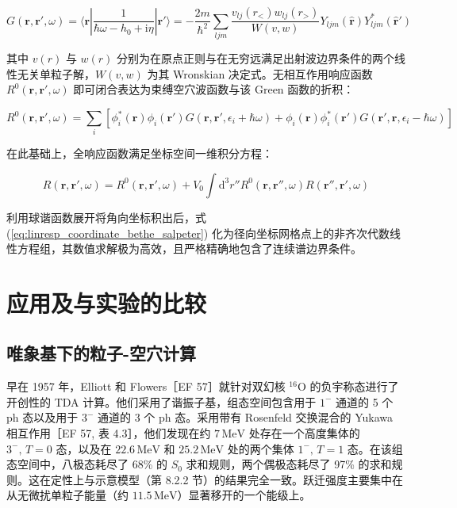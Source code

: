 \begin{equation}
G(\boldsymbol{r},\boldsymbol{r}',\omega)=\langle\boldsymbol{r}|\frac{1}{\hbar\omega-h_{0}+\mathrm{i}\eta}|\boldsymbol{r}'\rangle=-\frac{2m}{\hbar^{2}}\sum_{ljm}\frac{v_{lj}(r_{<})w_{lj}(r_{>})}{W(v,w)}Y_{ljm}(\hat{\boldsymbol{r}})Y^{*}_{ljm}(\hat{\boldsymbol{r}}')\label{eq:linresp_single_particle_green}
\end{equation}

其中 $v(r)$ 与 $w(r)$ 分别为在原点正则与在无穷远满足出射波边界条件的两个线性无关单粒子解，$W(v,w)$ 为其
Wronskian 决定式。无相互作用响应函数 $R^{0}(\boldsymbol{r},\boldsymbol{r}',\omega)$
即可闭合表达为束缚空穴波函数与该 Green 函数的折积：

\begin{equation}
R^{0}(\boldsymbol{r},\boldsymbol{r}',\omega)=\sum_{i}\left[\phi^{*}_{i}(\boldsymbol{r})\phi_{i}(\boldsymbol{r}')G(\boldsymbol{r},\boldsymbol{r}',\epsilon_{i}+\hbar\omega)+\phi_{i}(\boldsymbol{r})\phi^{*}_{i}(\boldsymbol{r}')G(\boldsymbol{r}',\boldsymbol{r},\epsilon_{i}-\hbar\omega)\right]\label{eq:linresp_r0_coordinate_space}
\end{equation}

在此基础上，全响应函数满足坐标空间一维积分方程：

\begin{equation}
R(\boldsymbol{r},\boldsymbol{r}',\omega)=R^{0}(\boldsymbol{r},\boldsymbol{r}',\omega)+V_{0}\int\mathrm{d}^{3}r''R^{0}(\boldsymbol{r},\boldsymbol{r}'',\omega)R(\boldsymbol{r}'',\boldsymbol{r}',\omega)\label{eq:linresp_coordinate_bethe_salpeter}
\end{equation}

利用球谐函数展开将角向坐标积出后，式 (\ref{eq:linresp_coordinate_bethe_salpeter}) 化为径向坐标网格点上的非齐次代数线性方程组，其数值求解极为高效，且严格精确地包含了连续谱边界条件。

\section{应用及与实验的比较\label{sec:8.6_=005E94=007528=0053CA=004E0E=005B9E=009A8C=007684=006BD4=008F83}}

\subsection{唯象基下的粒子-空穴计算\label{subsec:8.6.1_=00552F=008C61=0057FA=004E0B=007684=007C92=005B50-=007A7A=007A74=008BA1=007B97}}

早在 1957 年，Elliott 和 Flowers［EF 57］就针对双幻核 $^{16}\mathrm{O}$ 的负宇称态进行了开创性的
TDA 计算。他们采用了谐振子基，组态空间包含用于 $1^{-}$ 通道的 5 个 ph 态以及用于 $3^{-}$ 通道的 3
个 ph 态。采用带有 Rosenfeld 交换混合的 Yukawa 相互作用［EF 57, 表 4.3］，他们发现在约 $7\,\text{MeV}$
处存在一个高度集体的 $3^{-},\,T=0$ 态，以及在 $22.6\,\text{MeV}$ 和 $25.2\,\text{MeV}$
处的两个集体 $1^{-},\,T=1$ 态。在该组态空间中，八极态耗尽了 68\% 的 $S_{0}$ 求和规则，两个偶极态耗尽了
97\% 的求和规则。这在定性上与示意模型（第 8.2.2 节）的结果完全一致。跃迁强度主要集中在从无微扰单粒子能量（约 $11.5\,\text{MeV}$）显著移开的一个能级上。

